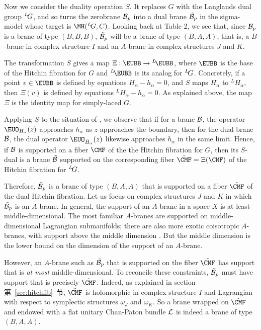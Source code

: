 Now we consider the duality operation $S$.  It replaces $G$ with
the Langlands dual group $^L\negthinspace G$, and so turns the
zerobrane ${\cal B}_p$ into a dual brane $\tilde{\cal B}_p$ in the
sigma-model whose target is $\MH(^L\negthinspace G,C)$. Looking
back at Table 2, we see that, since ${\cal B}_p$ is a brane of
type $(B,B,B)$, $\tilde {\cal B}_p$ will be a brane of type
$(B,A,A)$, that is, a $B$-brane in complex structure $I$ and an
$A$-brane in complex structures $J$ and $K$.

The transformation $S$ gives a map $\Xi:{\EUBB}\to
{}^L\negthinspace{\EUBB}$, where ${\EUBB}$ is the base of the
Hitchin fibration for $G$ and $^L\negthinspace{\EUBB}$ is its
analog for $^L\negthinspace G$.  Concretely, if a point $v\in
{\EUBB}$ is defined by equations $H_\alpha-h_\alpha=0$, and $S$
maps $H_{\alpha}$ to $^LH_{\alpha}$, then $\Xi(v)$ is defined by
equations $^LH_\alpha-h_\alpha=0$. As explained above, the map
$\Xi$ is the identity map for simply-laced $G$.

Applying $S$ to the situation of \trampo, we observe that if for a
brane ${\cal B}$, the operator ${\EUO}_{H_\alpha}(z)$ approaches
$h_\alpha$ as $z$ approaches the boundary, then for the dual brane
$\tilde {\cal B}$, the dual operator ${\EUO}_{\tilde H_\alpha}(z)$
likewise approaches $h_\alpha$ in the same limit.
 Hence, if ${\cal
B}$ is supported on a fiber ${\CMF}$ of the the Hitchin fibration
for $G$, then its $S$-dual is a brane $\tilde {\cal B}$ supported
on the corresponding fiber $\tilde {\CMF}=\Xi({\CMF})$ of the
Hitchin fibration for $^L\negthinspace G$.

Therefore, $\tilde{\cal B}_p$ is a brane of type $(B,A,A)$ that is
supported on a fiber $\tilde {\CMF}$ of the dual Hitchin
fibration. Let us focus on complex structures $J$ and $K$ in which
$\tilde{\cal B}_p$  is an $A$-brane.  In general, the support of
an $A$-brane in a space $X$ is at least middle-dimensional. The
most familiar $A$-branes are supported on middle-dimensional
Lagrangian submanifolds; there are also more exotic coisotropic
$A$-branes, with support above the middle dimension \cite{ref80}. But the middle dimension is the lower bound
on the dimension of the support of an $A$-brane.

However, an $A$-brane such as $\tilde {\cal B}_p$ that is
supported on the fiber $\tilde {\CMF}$ has support that is {\it at
most} middle-dimensional. To reconcile these constraints,
$\tilde{\cal B}_p$ must have support that is precisely $\tilde
{\CMF}$. Indeed, as explained in section 第~\ref{sec:hitchfib}~节, $\tilde
{\CMF}$ is holomorphic in complex structure $I$ and Lagrangian
with respect to symplectic structures $\omega_J$ and $\omega_K$.
So a brane wrapped on $\tilde {\CMF}$ and endowed with a flat
unitary Chan-Paton bundle ${\cal L}$ is indeed a brane of type
$(B,A,A)$.

